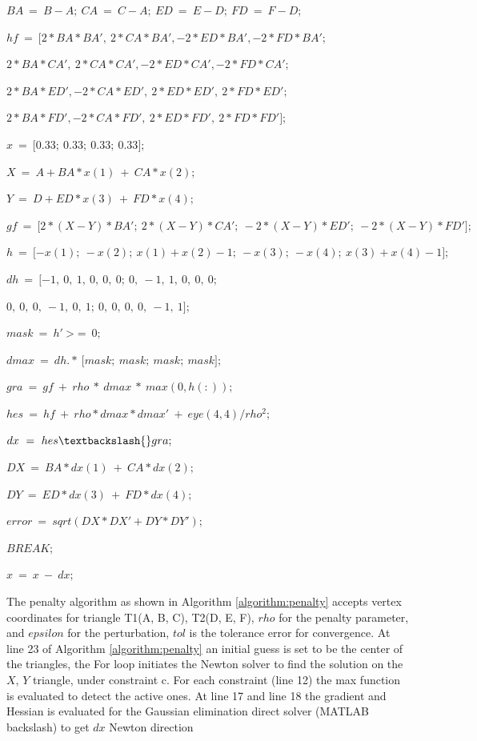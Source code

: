 \begin{algorithmic}[1]
	

		\State $BA~=~B-A;~CA~=~C-A;~ED~=~E-D;~FD~=~F-D;$

		\State $hf~=~{[}2{*}BA{*}BA',~2{*}CA{*}BA',-2{*}ED{*}BA',-2{*}FD{*}BA';$

		\State $2{*}BA{*}CA',~2{*}CA{*}CA',-2{*}ED{*}CA',-2{*}FD{*}CA';$

		\State $2{*}BA{*}ED',-2{*}CA{*}ED',~2{*}ED{*}ED',~2{*}FD{*}ED';$

		\State $2{*}BA{*}FD',-2{*}CA{*}FD',~2{*}ED{*}FD',~2{*}FD{*}FD'{]};$

		\State $x~=~{[}0.33;~0.33;~0.33;~0.33{]};$


			\State $X~=~A+BA{*}x(1)~+~CA{*}x(2);$

			\State $Y~=~D+ED{*}x(3)~+~FD{*}x(4);$

			\State $gf~=~{[}2{*}(X-Y){*}BA';~2{*}(X-Y){*}CA';~-2{*}(X-Y){*}ED';~-2{*}(X-Y){*}FD'{]};$

			\State $h~=~{[}-x(1);~-x(2);~x(1)+x(2)-1;~-x(3);~-x(4);~x(3)+x(4)-1{]};$

			\State $dh~=~{[}-1,~0,~1,~0,~0,~0;~0,~-1,~1,~0,~0,~0;$

			\State $0,~0,~0,~-1,~0,~1;~0,~0,~0,~0,~-1,~1{]};$

			\State $mask~=~h'~$>$=~0;$

			\State $dmax~=~dh.{*}~{[}mask;~mask;~mask;~mask{]};$

			\State $gra~=~gf~+~rho~{*}~dmax~{*}~max(0,h(:));$

			\State $hes~=~hf~+~rho{*}dmax{*}dmax'~+~eye(4,4)/rho^2;$

			\State $dx~=~hes\textbackslash{}gra;$

			\State $DX~=~BA{*}dx(1)~+~CA{*}dx(2);$

			\State $DY~=~ED{*}dx(3)~+~FD{*}dx(4);$

			\State $error~=~sqrt(DX{*}DX'+DY{*}DY');$

				\State $BREAK;$
			\EndIf

			\State $x~=~x~-~dx;$

		\EndFor

	\EndFunction
	
 	\label{algorithm:penalty}
\end{algorithmic}

The penalty algorithm as shown in Algorithm \ref{algorithm:penalty} accepts vertex coordinates for triangle T1(A, B, C), T2(D, E, F), $rho$ for the penalty parameter, and $epsilon$ for the perturbation, $tol$ is the tolerance error for convergence. At line 23 of Algorithm \ref{algorithm:penalty} an initial guess is set to be the center of the triangles, the For loop initiates the Newton solver to find the solution on the $X$, $Y$ triangle, under constraint c. For each constraint (line 12) the max function is evaluated to detect the active ones. At line 17 and line 18 the gradient and Hessian is evaluated for the Gaussian elimination direct solver (MATLAB backslash) to get $dx$ Newton direction

